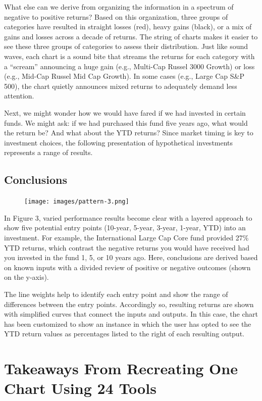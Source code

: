 \documentclass[]{book}
\begin{document}
What else can we derive from organizing the information in a spectrum of
negative to positive returns? Based on this organization, three groups
of categories have resulted in straight losses (red), heavy gains
(black), or a mix of gains and losses across a decade of returns. The
string of charts makes it easier to see these three groups of categories
to assess their distribution. Just like sound waves, each chart is a
sound bite that streams the returns for each category with a ``scream''
announcing a huge gain (e.g., Multi-Cap Russel 3000 Growth) or loss
(e.g., Mid-Cap Russel Mid Cap Growth). In some cases (e.g., Large Cap
S\&P 500), the chart quietly announces mixed returns to adequately
demand less attention.

Next, we might wonder how we would have fared if we had invested in
certain funds. We might ask: if we had purchased this fund five years
ago, what would the return be? And what about the YTD returns? Since
market timing is key to investment choices, the following presentation
of hypothetical investments represents a range of results.

\subsection{Conclusions}\label{conclusions}

\begin{figure}
\centering
\texttt{[image: images/pattern-3.png]}
\caption{}
\end{figure}

In Figure 3, varied performance results become clear with a layered
approach to show five potential entry points (10-year, 5-year, 3-year,
1-year, YTD) into an investment. For example, the International Large
Cap Core fund provided 27\% YTD returns, which contrast the negative
returns you would have received had you invested in the fund 1, 5, or 10
years ago. Here, conclusions are derived based on known inputs with a
divided review of positive or negative outcomes (shown on the y-axis).

The line weights help to identify each entry point and show the range of
differences between the entry points. Accordingly so, resulting returns
are shown with simplified curves that connect the inputs and outputs. In
this case, the chart has been customized to show an instance in which
the user has opted to see the YTD return values as percentages listed to
the right of each resulting output.

\section{Takeaways From Recreating One Chart Using 24
Tools}\label{takeaways-from-recreating-one-chart-using-24-tools}
\end{document}

